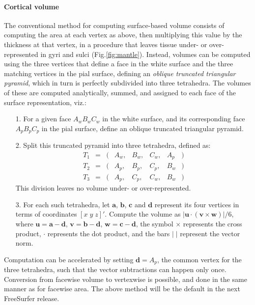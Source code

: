 \paragraph{Cortical volume}

The conventional method for computing surface-based volume consists of computing the area at each vertex as above, then multiplying this value by the thickness at that vertex, in a procedure that leaves tissue under- or over-represented in gyri and sulci (Fig.\ref{fig:mantle}). Instead, volumes can be computed using the three vertices that define a face in the white surface and the three matching vertices in the pial surface, defining an \emph{oblique truncated triangular pyramid}, which in turn is perfectly subdivided into three tetrahedra. The volumes of these are computed analytically, summed, and assigned to each face of the surface representation, viz.:

\begin{itemize}[leftmargin=*]
\item[1.] For a given face $A_w B_w C_w$ in the white surface, and its corresponding face $A_p B_p C_p$ in the pial surface, define an oblique truncated triangular pyramid.
\item[2.] Split this truncated pyramid into three tetrahedra, defined as:
$$
\begin{array}{lcllllll}
T_1 &=& (&A_w,&B_w,&C_w,&A_p&)\\
T_2 &=& (&A_p,&B_p,&C_p,&B_w&)\\
T_3 &=& (&A_p,&C_p,&C_w,&B_w&)
\end{array}$$
This division leaves no volume under- or over-represented.
\item[3.] For each such tetrahedra, let $\mathbf{a}$, $\mathbf{b}$, $\mathbf{c}$ and $\mathbf{d}$ represent its four vertices in terms of coordinates $[x\;y\;z]'$. Compute the volume as $|\mathbf{u}\cdot(\mathbf{v} \times \mathbf{w})|/6$, where $\mathbf{u} = \mathbf{a}-\mathbf{d}$, $\mathbf{v} = \mathbf{b}-\mathbf{d}$, $\mathbf{w} = \mathbf{c}-\mathbf{d}$, the symbol $\times$ represents the cross product, $\cdot$ represents the dot product, and the bars $|\;|$ represent the vector norm.
\end{itemize}

\noindent
Computation can be accelerated by setting $\mathbf{d}=A_p$, the common vertex for the three tetrahedra, such that the vector subtractions can happen only once. Conversion from facewise volume to vertexwise is possible, and done in the same manner as for facewise area. The above method will be the default in the next FreeSurfer release.

